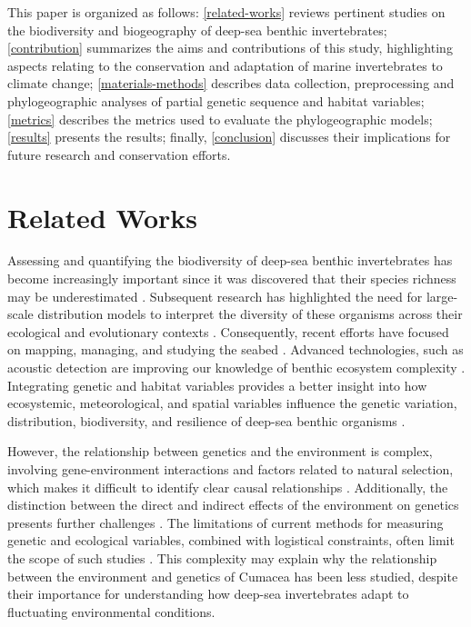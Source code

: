 This paper is organized as follows: \autoref{related-works} reviews pertinent studies on the biodiversity and biogeography of deep-sea benthic invertebrates; \autoref{contribution} summarizes the aims and contributions of this study, highlighting aspects relating to the conservation and adaptation of marine invertebrates to climate change; \autoref{materials-methods} describes data collection, preprocessing and phylogeographic analyses of partial genetic sequence and habitat variables; \autoref{metrics} describes the metrics used to evaluate the phylogeographic models; \autoref{results} presents the results; finally, \autoref{conclusion} discusses their implications for future research and conservation efforts.

\section{Related Works}\label{related-works}
Assessing and quantifying the biodiversity of deep-sea benthic invertebrates has become increasingly important since it was discovered that their species richness may be underestimated \citep{grassle1992deep}. Subsequent research has highlighted the need for large-scale distribution models to interpret the diversity of these organisms across their ecological and evolutionary contexts \citep{rex1997large}. Consequently, recent efforts have focused on mapping, managing, and studying the seabed \citep{brown2011benthic}. Advanced technologies, such as acoustic detection are improving our knowledge of benthic ecosystem complexity \citep{brown2011benthic}. Integrating genetic and habitat variables provides a better insight into how ecosystemic, meteorological, and spatial variables influence the genetic variation, distribution, biodiversity, and resilience of deep-sea benthic organisms \citep{vrijenhoek2009cryptic}.

However, the relationship between genetics and the environment is complex, involving gene-environment interactions and factors related to natural selection, which makes it difficult to identify clear causal relationships \citep{balkenhol_identifying_2009}. Additionally, the distinction between the direct and indirect effects of the environment on genetics presents further challenges \citep{manel_perspectives_2010, balkenhol_landscape_2019}. The limitations of current methods for measuring genetic and ecological variables, combined with logistical constraints, often limit the scope of such studies \citep{manel_perspectives_2010, shafer_widespread_2013}. This complexity may explain why the relationship between the environment and genetics of Cumacea has been less studied, despite their importance for understanding how deep-sea invertebrates adapt to fluctuating environmental conditions.

